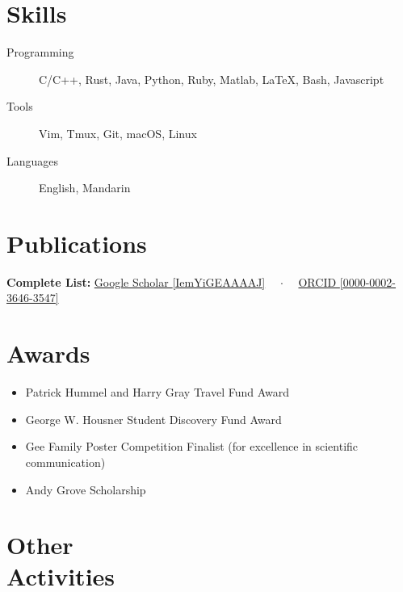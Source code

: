 \documentclass{mycv}
\begin{document}
\section{Skills}

\begin{description}
  \item[Programming] C/C++, Rust, Java, Python, Ruby, Matlab, \LaTeX, Bash, Javascript
  \item[Tools] Vim, Tmux, Git, macOS, Linux
  \item[Languages] English, Mandarin
\end{description}

\section{Publications}%

\textbf{Complete List:}
\href{https://scholar.google.com/citations?user=IemYiGEAAAAJ}{Google Scholar \textsf{\footnotesize [IemYiGEAAAAJ]}}%
{~~$\cdot$~~}%
\href{https://orcid.org/0000-0002-3646-3547}{ORCID \textsf{\footnotesize [0000-0002-3646-3547]}}%




\section{Awards}

\begin{itemize}
  \item Patrick Hummel and Harry Gray Travel Fund Award 
  \item George W. Housner Student Discovery Fund Award 
  \item Gee Family Poster Competition Finalist (for excellence in scientific communication) 
  \item Andy Grove Scholarship 
\end{itemize}

\section{Other \\ Activities}
\end{document}
